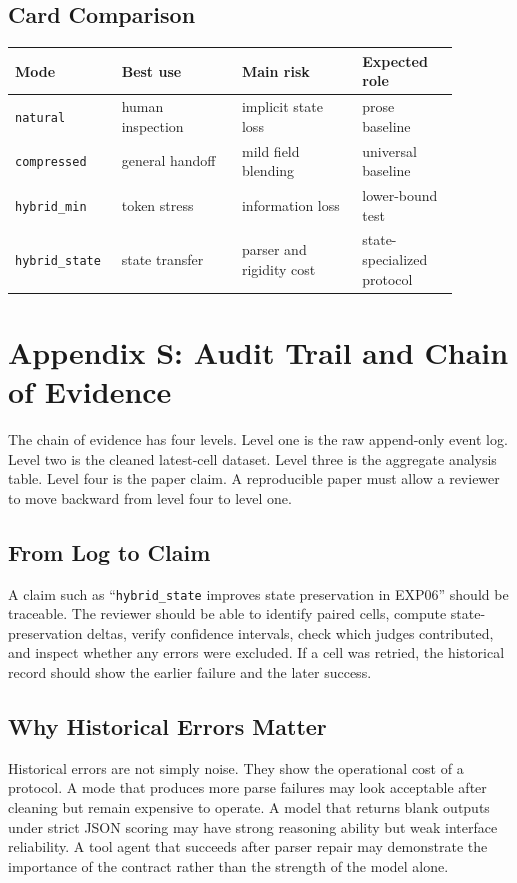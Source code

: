\documentclass[11pt]{article}
\begin{document}
\subsection{Card Comparison}
\begin{longtable}{p{0.18\linewidth}p{0.25\linewidth}p{0.25\linewidth}p{0.20\linewidth}}
\toprule
Mode & Best use & Main risk & Expected role \\
\midrule
\endhead
\texttt{natural} & human inspection & implicit state loss & prose baseline \\
\texttt{compressed} & general handoff & mild field blending & universal baseline \\
\texttt{hybrid\_min} & token stress & information loss & lower-bound test \\
\texttt{hybrid\_state} & state transfer & parser and rigidity cost & state-specialized protocol \\
\bottomrule
\end{longtable}

\clearpage
\section{Appendix S: Audit Trail and Chain of Evidence}
The chain of evidence has four levels. Level one is the raw append-only event log. Level two is the cleaned latest-cell dataset. Level three is the aggregate analysis table. Level four is the paper claim. A reproducible paper must allow a reviewer to move backward from level four to level one.

\subsection{From Log to Claim}
A claim such as ``\texttt{hybrid\_state} improves state preservation in EXP06'' should be traceable. The reviewer should be able to identify paired cells, compute state-preservation deltas, verify confidence intervals, check which judges contributed, and inspect whether any errors were excluded. If a cell was retried, the historical record should show the earlier failure and the later success.

\subsection{Why Historical Errors Matter}
Historical errors are not simply noise. They show the operational cost of a protocol. A mode that produces more parse failures may look acceptable after cleaning but remain expensive to operate. A model that returns blank outputs under strict JSON scoring may have strong reasoning ability but weak interface reliability. A tool agent that succeeds after parser repair may demonstrate the importance of the contract rather than the strength of the model alone.
\end{document}
